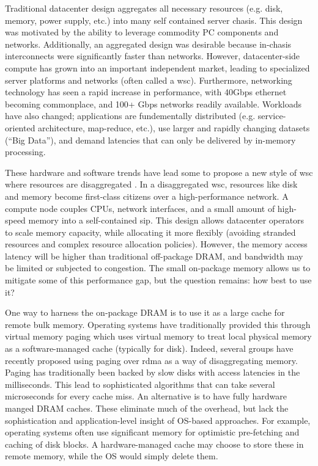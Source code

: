 Traditional datacenter design aggregates all necessary resources (e.g. disk,
memory, power supply, etc.) into many self contained server chasis. This design
was motivated by the ability to leverage commodity PC components and
networks.  Additionally, an aggregated design was
desirable because in-chasis interconnects were significantly faster than
networks. However, datacenter-side compute has grown into an important
independent market, leading to specialized server platforms and networks (often
called a \gls{wsc}).  Furthermore, networking technology
has seen a rapid increase in performance, with 40Gbps ethernet becoming
commonplace, and 100+ Gbps networks readily available. Workloads have also
changed; applications are fundementally distributed (e.g. service-oriented
architecture, map-reduce,
etc.), use larger and rapidly changing datasets (``Big Data''), and demand
latencies that can only be delivered by in-memory processing.

These hardware and software trends have lead some to propose a new style of
\gls{wsc} where resources are
disaggregated \cite{firebox}\cite{themachine}\cite{huaweidc30}\cite{intelrsa}\cite{fbdisag}.
In a disaggregated \gls{wsc}, resources like disk and memory become first-class
citizens over a high-performance network. A compute node couples CPUs, network
interfaces, and a small amount of high-speed memory into a self-contained
\gls{sip}. This design allows datacenter operators to scale
memory capacity, while allocating it more flexibly (avoiding stranded resources
and complex resource allocation policies). However, the memory access latency
will be higher than traditional off-package DRAM, and bandwidth may be limited
or subjected to congestion. The small on-package memory allows us to mitigate
some of this performance gap, but the question remains: how best to use it?

One way to harness the on-package DRAM is to use it as a large cache for 
remote bulk memory. Operating systems have traditionally provided this through
virtual memory \gls{paging} which uses virtual memory to treat local physical memory
as a software-managed cache (typically for disk). Indeed, several groups have
recently proposed using paging over \gls{rdma} as a way of disaggregating
memory\cite{infiniswap}\cite{osdidisag}. Paging has traditionally been backed
by slow disks with access latencies in the milliseconds. This lead to
sophisticated algorithms that can take several microseconds for every cache
miss. An alternative is to have fully hardware manged DRAM
caches\cite{volos_DRAM}\cite{lee_tagless}. These eliminate much of the
overhead, but lack the sophistication and application-level insight of OS-based
approaches. For example, operating systems often use significant memory for
optimistic pre-fetching and caching of disk blocks. A hardware-managed cache
may choose to store these in remote memory, while the OS would simply delete
them.

